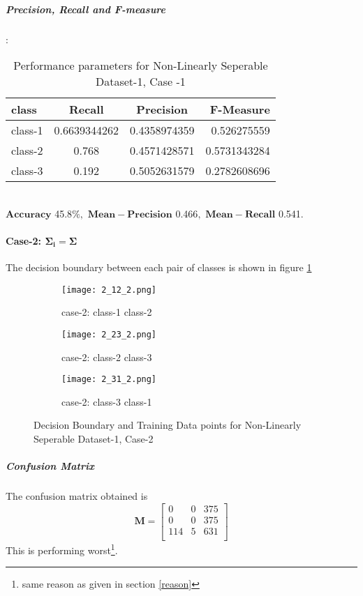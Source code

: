 \documentclass[a4paper]{article}
\begin{document}
\subparagraph{Precision, Recall and F-measure}:
\begin{table}[h!]
  \begin{center}
    \caption{Performance parameters for Non-Linearly Seperable Dataset-1, Case -1}
    \label{tab:table1}
    \begin{tabular}{l|c|c|r} %
      \textbf{class} & \textbf{Recall} & \textbf{Precision} & \textbf{F-Measure}\\
      \hline
      class-1 & 0.6639344262 & 0.4358974359 & 0.526275559\\
      class-2 & 0.768 & 0.4571428571 & 0.5731343284\\
      class-3 & 0.192 & 0.5052631579 & 0.2782608696\\
    \end{tabular}
  \end{center}
\end{table}
\\
$\mathbf{Accuracy}$ 45.8$\%,$ $\mathbf{Mean- Precision}$ 0.466$,$ $\mathbf{Mean -Recall}$ 0.541$.$
\newpage
\paragraph{Case-2: $\mathbf{\Sigma_{i}}=\mathbf{\Sigma}$}

The decision boundary between each pair of classes is shown in figure \ref{fig:2_2}
\begin{figure}[h!]
  \centering
  \begin{subfigure}[b]{0.4\linewidth}
    \texttt{[image: 2\_12\_2.png]}
     \caption{case-2: class-1 class-2}
  \end{subfigure}
  \begin{subfigure}[b]{0.4\linewidth}
    \texttt{[image: 2\_23\_2.png]}
    \caption{case-2: class-2 class-3}
  \end{subfigure}
  \begin{subfigure}[b]{0.4\linewidth}
    \texttt{[image: 2\_31\_2.png]}
    \caption{case-2: class-3 class-1}
  \end{subfigure}
  \caption{Decision Boundary and Training Data points for Non-Linearly Seperable Dataset-1, Case-2}
  \label{fig:2_2}
\end{figure}
\subparagraph{Confusion Matrix}
The confusion matrix obtained is
\[
\mathbf{M} = \left[ {\begin{array}{ccc}
0 & 0 & 375\\
0 & 0 & 375\\
114 & 5 & 631\\
\end{array}} \right]
\]This is performing worst\footnote{same reason as given in section \ref{reason}}.\\
\end{document}
